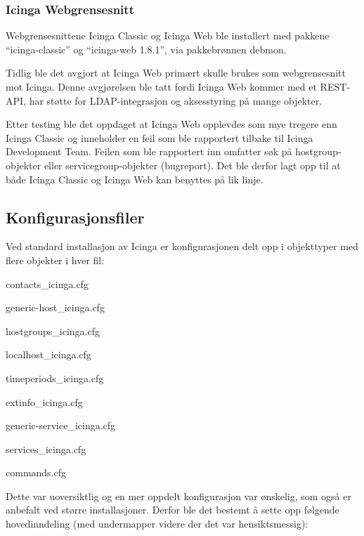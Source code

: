 \subsubsection{Icinga Webgrensesnitt}
Webgrensesnittene Icinga Classic og Icinga Web ble installert med pakkene ``icinga-classic'' og ``icinga-web 1.8.1'', via pakkebrønnen debmon. 

Tidlig ble det avgjort at Icinga Web primært skulle brukes som webgrensesnitt mot Icinga. Denne avgjørelsen ble tatt fordi Icinga Web kommer med et REST-API, har støtte for LDAP-integrasjon og aksesstyring på mange objekter.

Etter testing ble det oppdaget at Icinga Web opplevdes som mye tregere enn Icinga Classic og inneholder en feil som ble rapportert tilbake til Icinga Development Team. Feilen som ble rapportert inn omfatter søk på hostgroup-objekter eller servicegroup-objekter (bugreport\cite{icingawebbug}). Det ble derfor lagt opp til at både Icinga Classic og Icinga Web kan benyttes på lik linje.
\subsection{Konfigurasjonsfiler}
Ved standard installasjon av Icinga er konfigurasjonen delt opp i objekttyper med flere objekter i hver fil:
\begin{itemize*}
\item contacts\_icinga.cfg  
\item generic-host\_icinga.cfg     
\item hostgroups\_icinga.cfg  
\item localhost\_icinga.cfg  
\item timeperiods\_icinga.cfg
\item extinfo\_icinga.cfg   
\item generic-service\_icinga.cfg   
\item services\_icinga.cfg
\item commands.cfg
\end{itemize*}
Dette var uoversiktlig og en mer oppdelt konfigurasjon var ønskelig, som også er anbefalt ved større installasjoner\cite{nagiosenterprise,sysadmin}. Derfor ble det bestemt å sette opp følgende hovedinndeling (med undermapper videre der det var hensiktsmessig):

\makeatletter
\newcount\dirtree@lvl
\newcount\dirtree@plvl
\newcount\dirtree@clvl
\def\dirtree@growth{%
  \ifnum\tikznumberofcurrentchild=1\relax
  \global\advance\dirtree@plvl by 1
  \expandafter\xdef\csname dirtree@p@\the\dirtree@plvl\endcsname{\the\dirtree@lvl}
  \fi
  \global\advance\dirtree@lvl by 1\relax
  \dirtree@clvl=\dirtree@lvl
  \advance\dirtree@clvl by -\csname dirtree@p@\the\dirtree@plvl\endcsname
  \pgf@xa=0.5cm\relax
  \pgf@ya=-0.5cm\relax
  \pgf@ya=\dirtree@clvl\pgf@ya
  \pgftransformshift{\pgfqpoint{\the\pgf@xa}{\the\pgf@ya}}%
  \ifnum\tikznumberofcurrentchild=\tikznumberofchildren
  \global\advance\dirtree@plvl by -1
  \fi
}

